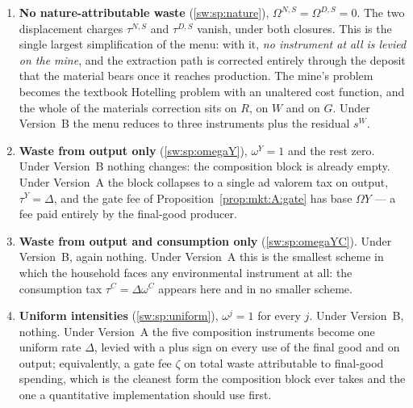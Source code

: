 \begin{enumerate}[label=\textbf{(W\arabic*)},ref=W\arabic*,leftmargin=3.2em,itemsep=0.35em]

\item \textbf{No nature-attributable waste} (\ref{sw:sp:nature}), $\Omega^{N,S}=\Omega^{D,S}=0$. The
two displacement charges $\tau^{N,S}$ and $\tau^{D,S}$ vanish, under both closures. This is the single
largest simplification of the menu: with it, \emph{no instrument at all is levied on the mine}, and the
extraction path is corrected entirely through the deposit that the material bears once it reaches
production. The mine's problem becomes the textbook Hotelling problem with an unaltered cost function,
and the whole of the materials correction sits on $R$, on $W$ and on $G$. Under Version~B the menu
reduces to three instruments plus the residual $s^W$.

\item \textbf{Waste from output only} (\ref{sw:sp:omegaY}), $\omega^Y=1$ and the rest zero. Under
Version~B nothing changes: the composition block is already empty. Under Version~A the block collapses
to a single ad valorem tax on output, $\tau^Y=\Delta$, and the gate fee of
Proposition~\ref{prop:mkt:A:gate} has base $\Omega Y$ --- a fee paid entirely by the final-good
producer.

\item \textbf{Waste from output and consumption only} (\ref{sw:sp:omegaYC}). Under Version~B, again
nothing. Under Version~A this is the smallest scheme in which the household faces any environmental
instrument at all: the consumption tax $\tau^C=\Delta\omega^C$ appears here and in no smaller scheme.

\item \textbf{Uniform intensities} (\ref{sw:sp:uniform}), $\omega^j=1$ for every $j$. Under Version~B,
nothing. Under Version~A the five composition instruments become one uniform rate $\Delta$, levied with
a plus sign on every use of the final good and on output; equivalently, a gate fee $\zeta$ on total
waste attributable to final-good spending, which is the cleanest form the composition block ever takes
and the one a quantitative implementation should use first.


\end{enumerate}
